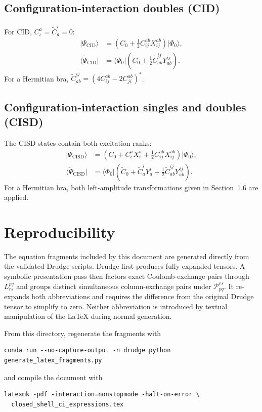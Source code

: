 \documentclass[10pt]{article}
\newcommand{\vac}{\Phi_0}
\newcommand{\tC}{\widetilde{C}}
\newcommand{\tPsi}{\widetilde{\Psi}}
\begin{document}


\clearpage
\subsection{Configuration-interaction doubles (CID)}

For CID, $C_i^a=\tC_a^i=0$:
\begin{align}
 \lvert\Psi_{\mathrm{CID}}\rangle
 &=\left(C_0+\frac12C_{ij}^{ab}X_{ij}^{ab}\right)
   \lvert\vac\rangle,
 \\
 \langle\tPsi_{\mathrm{CID}}\rvert
 &=\langle\vac\rvert\left(
   \tC_0+\frac12\tC_{ab}^{ij}Y_{ab}^{ij}
   \right).
\end{align}
For a Hermitian bra,
$\tC_{ab}^{ij}=(4C_{ij}^{ab}-2C_{ji}^{ab})^*$.



\clearpage
\subsection{Configuration-interaction singles and doubles (CISD)}

The CISD states contain both excitation ranks:
\begin{align}
 \lvert\Psi_{\mathrm{CISD}}\rangle
 &=\left(
   C_0+C_i^aX_i^a+\frac12C_{ij}^{ab}X_{ij}^{ab}
   \right)\lvert\vac\rangle,
 \\
 \langle\tPsi_{\mathrm{CISD}}\rvert
 &=\langle\vac\rvert\left(
   \tC_0+\tC_a^iY_a^i+\frac12\tC_{ab}^{ij}Y_{ab}^{ij}
   \right).
\end{align}
For a Hermitian bra, both left-amplitude transformations given in
Section~1.6 are applied.

\begingroup
\setlength{\jot}{1pt}

\endgroup

\clearpage
\appendix
\section{Reproducibility}

The equation fragments included by this document are generated directly from
the validated Drudge scripts. Drudge first produces fully expanded tensors.
A symbolic presentation pass then factors exact Coulomb-exchange pairs through
$L_{rs}^{pq}$ and groups distinct simultaneous column-exchange pairs under
$\mathcal P_{pq}^{rs}$. It re-expands both abbreviations and requires the
difference from the original Drudge tensor to simplify to zero. Neither
abbreviation is introduced by textual manipulation of the LaTeX during normal
generation.

From this directory, regenerate the fragments with
\begin{verbatim}
conda run --no-capture-output -n drudge python generate_latex_fragments.py
\end{verbatim}
and compile the document with
\begin{verbatim}
latexmk -pdf -interaction=nonstopmode -halt-on-error \
  closed_shell_ci_expressions.tex
\end{verbatim}
\end{document}
